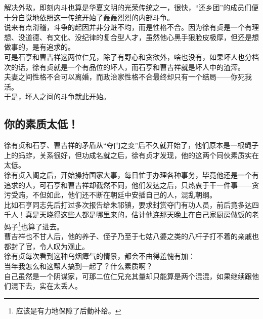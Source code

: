 	\begin{multicols}{\theparacolNo}
\fi
解决外敌，即刻内斗也算是华夏文明的光荣传统之一，很快，“还乡团”的成员们便十分自觉地依照这一传统开始了轰轰烈烈的内部斗争。\\

说来有点滑稽，斗争的起因并非分赃不均，而是性格不合。因为徐有贞是一个有理想、没道德、有文化、没纪律的复合型人才，虽然他心黑手狠脸皮极厚，但还是想做事的，是有追求的。\\

可是石亨和曹吉祥这两位仁兄，除了有野心和贪欲外，啥也没有，如果坏人也分档次的话，徐有贞就是一个有品位的坏人，而石亨和曹吉祥就是坏人中的渣滓。\\

夫妻之间性格不合可以离婚，而政治家性格不合最终却只有一个结局——你死我活。\\

于是，坏人之间的斗争就此开始。\\

\subsection{你的素质太低！}
徐有贞和石亨、曹吉祥的矛盾从“夺门之变”后不久就开始了，他们原本是一根绳子上的蚂蚱，关系很好，但功成名就之后，徐有贞才发现，他的这两个同伙素质实在太低。\\

徐有贞入阁之后，开始操持国家大事，每日忙于办理各种事务，毕竟他还是一个有追求的人，可石亨和曹吉祥却截然不同，他们发达之后，只热衷于干一件事——贪污受贿，不但如此，他们还不断在朝廷中安插自己的人，混乱朝纲。\\

比如石亨同志先后打过多次报告给朱祁镇，要求封赏夺门有功人员，前后竟多达四千人！真是天晓得这些人都是哪里来的，估计他连那天晚上在自己家厨房做饭的老妈子\footnote{应该是有力地保障了后勤补给。}也算了进去。\\

曹吉祥也不甘人后，他的养子、侄子乃至于七姑八婆之类的八杆子打不着的亲戚也都封了官，令人叹为观止。\\

徐有贞每次看到这种乌烟瘴气的情景，都会不由得羞愧有加：\\

当年我怎么和这帮人搞到一起了？什么素质啊？\\

自己虽然是一个阴谋家，可那二位仁兄充其量却只能算是两个混混，如果继续跟他们混下去，实在太丢人。\\


\end{multicols}
